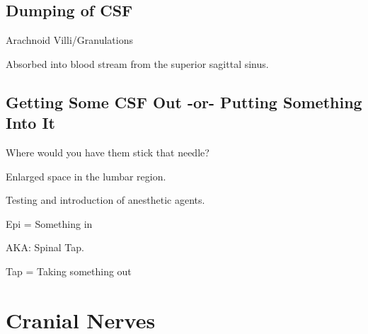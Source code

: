 \subsection{Dumping of CSF}

\begin{coloredlist}
    \item Arachnoid Villi/Granulations
    \begin{coloredlist}
        \item Absorbed into blood stream from the superior sagittal sinus.
    \end{coloredlist}
\end{coloredlist}

\subsection{Getting Some CSF Out -or- Putting Something Into It}

\begin{coloredlist}
    \item Where would you have them stick that needle?
    \begin{coloredlist}
        \item {}
        \begin{coloredlist}
            \item Enlarged space in the lumbar region.
            \item Testing and introduction of anesthetic agents.
            \item Epi = Something in
        \end{coloredlist}
        \item {}
        \begin{coloredlist}
            \item AKA: Spinal Tap.
            \item Tap = Taking something out
        \end{coloredlist}
    \end{coloredlist}
\end{coloredlist}

\section{Cranial Nerves}

